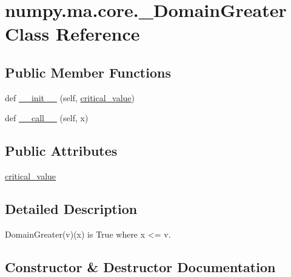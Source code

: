 \hypertarget{classnumpy_1_1ma_1_1core_1_1__DomainGreater}{}\section{numpy.\+ma.\+core.\+\_\+\+Domain\+Greater Class Reference}
\label{classnumpy_1_1ma_1_1core_1_1__DomainGreater}
\subsection*{Public Member Functions}
\begin{DoxyCompactItemize}
\item 
def \hyperlink{classnumpy_1_1ma_1_1core_1_1__DomainGreater_ad7cc71360fb7dfe55250fdeec897bbcf}{\+\_\+\+\_\+init\+\_\+\+\_\+} (self, \hyperlink{classnumpy_1_1ma_1_1core_1_1__DomainGreater_a45021c1e2441c6f13964d938d4925891}{critical\+\_\+value})
\item 
def \hyperlink{classnumpy_1_1ma_1_1core_1_1__DomainGreater_a4dbc38309f7c5e6efe5ec76cb6c0040c}{\+\_\+\+\_\+call\+\_\+\+\_\+} (self, x)
\end{DoxyCompactItemize}
\subsection*{Public Attributes}
\begin{DoxyCompactItemize}
\item 
\hyperlink{classnumpy_1_1ma_1_1core_1_1__DomainGreater_a45021c1e2441c6f13964d938d4925891}{critical\+\_\+value}
\end{DoxyCompactItemize}


\subsection{Detailed Description}
\begin{DoxyVerb}DomainGreater(v)(x) is True where x <= v.\end{DoxyVerb}
 

\subsection{Constructor \& Destructor Documentation}
\mbox{\label{classnumpy_1_1ma_1_1core_1_1__DomainGreater_ad7cc71360fb7dfe55250fdeec897bbcf}} 

